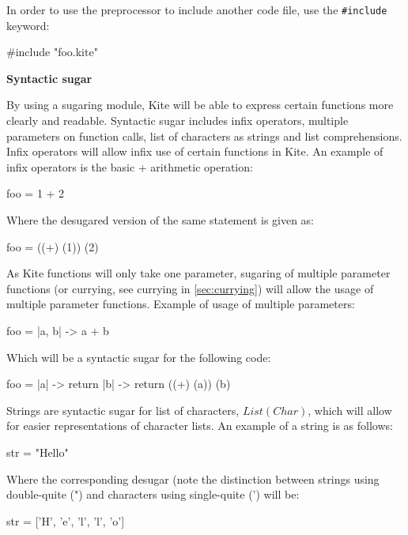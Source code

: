 In order to use the preprocessor to include another code file, use the \texttt{\#include} keyword:
\begin{kite}
  
  #include "foo.kite"
\end{kite}

\textbf{Syntactic sugar}

By using a sugaring module, Kite will be able to express certain
functions more clearly and readable. Syntactic sugar includes infix
operators, multiple parameters on function calls, list of characters
as strings and list comprehensions.
Infix operators will allow infix use of certain functions in Kite. An
example of infix operators is the basic + arithmetic operation:
\begin{kite}
  
  foo = 1 + 2
\end{kite}

Where the desugared version of the same statement is given as:

\begin{kite}

  foo = ((+) (1)) (2)
\end{kite}

As Kite functions will only take one parameter, sugaring of multiple
parameter functions (or currying, see currying in \ref{sec:currying})
will allow the usage of multiple parameter functions. Example of usage
of multiple parameters:
\begin{kite}
  
  foo = |a, b| -> {
    a + b
  }
\end{kite}
Which will be a syntactic sugar for the following code:
\begin{kite}

  foo = |a| -> {
    return |b| -> {
      return ((+) (a)) (b)
    }
  }
\end{kite}

Strings are syntactic sugar for list of characters, $List(Char)$,
which will allow for easier representations of character lists. An
example of a string is as follows:
\begin{kite}
  
  str = "Hello"
\end{kite}

Where the corresponding desugar (note the distinction between strings
using double-quite (") and characters using single-quite (') will be:
\begin{kite}
  
  str = ['H', 'e', 'l', 'l', 'o']
\end{kite}

